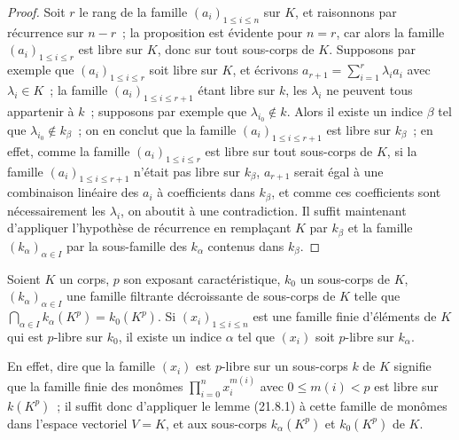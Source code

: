 \begin{proof}
Soit $r$ le rang de la famille $(a_i)_{1\leqslant i\leqslant n}$ sur $K$, et
raisonnons par récurrence sur $n-r$~; la proposition est évidente pour $n=r$,
car alors la famille $(a_i)_{1\leqslant i\leqslant r}$ est libre sur $K$, donc
sur tout sous-corps de $K$. Supposons par exemple que
$(a_i)_{1\leqslant i\leqslant r}$ soit libre sur $K$, et écrivons
$a_{r+1}=\sum_{i=1}^r\lambda_i a_i$ avec $\lambda_i\in K$~; la famille
$(a_i)_{1\leqslant i\leqslant r+1}$ étant libre sur $k$, les $\lambda_i$ ne
peuvent tous appartenir à $k$~; supposons par exemple que
$\lambda_{i_0}\notin k$. Alors il existe un indice $\beta$ tel que
$\lambda_{i_0}\notin k_\beta$~; on en conclut que la famille $(a_i)_{1\leqslant i\leqslant r+1}$ est libre sur $k_\beta$~; en effet, comme la
famille $(a_i)_{1\leqslant i\leqslant r}$ est libre sur tout sous-corps de
$K$, si la famille $(a_i)_{1\leqslant i\leqslant r+1}$ n'était pas libre sur
$k_\beta$, $a_{r+1}$ serait égal à une combinaison linéaire des $a_i$ à
coefficients dans $k_\beta$, et comme ces coefficients sont nécessairement
les $\lambda_i$, on aboutit à une contradiction. Il suffit maintenant
d'appliquer l'hypothèse de récurrence en remplaçant $K$ par $k_\beta$ et la
famille $(k_\alpha)_{\alpha\in I}$ par la sous-famille des $k_\alpha$
contenus dans $k_\beta$.
\end{proof}

\begin{lemma}[21.8.2]
\label{0.21.8.2-fr}
Soient $K$ un corps, $p$ son exposant caractéristique, $k_0$ un sous-corps de
$K$, $(k_\alpha)_{\alpha\in I}$ une famille filtrante décroissante de
sous-corps de $K$ telle que $\bigcap_{\alpha\in I}k_\alpha(K^p)=k_0(K^p)$.
Si $(x_i)_{1\leqslant i\leqslant n}$ est une famille finie d'éléments de $K$
qui est $p$-libre sur $k_0$, il existe un indice $\alpha$ tel que $(x_i)$ soit
$p$-libre sur $k_\alpha$.

En effet, dire que la famille $(x_i)$ est $p$-libre sur un sous-corps $k$
de $K$ signifie que la famille finie des monômes
$\prod_{i=0}^n x_i^{m(i)}$ avec $0\leqslant m(i)<p$ est libre sur $k(K^p)$~;
il suffit donc d'appliquer le lemme (21.8.1) à cette famille de monômes dans
l'espace vectoriel $V=K$, et aux sous-corps $k_\alpha(K^p)$ et $k_0(K^p)$
de $K$.
\end{lemma}

